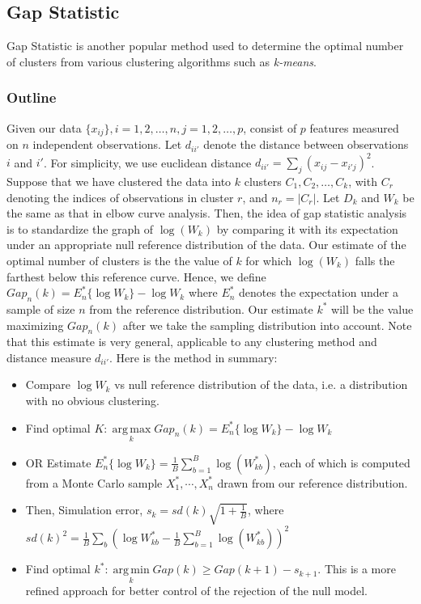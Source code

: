 \subsection{Gap Statistic} \label{2.2.3}
Gap Statistic \cite{Tibshirani2001} is another popular method used to determine the optimal number of clusters from various clustering algorithms such as \textit{k-means}. 
\subsubsection{Outline}
Given our data $\{x_{ij}\}, i =1,2,\dots,n, j = 1,2,\dots, p$, consist of $p$ features measured on $n$ independent observations. Let $d_{ii'}$ denote the distance between observations $i$ and $i'$. For simplicity, we use euclidean distance $d_{ii'} = \sum_j (x_{ij}-x_{i'j})^2$.
Suppose that we have clustered the data into $k$ clusters $C_1, C_2, \dots, C_k$, with $C_r$ denoting the indices of observations in cluster $r$, and $n_r = |C_r|$. Let $D_k$ and $W_k$ be the same as that in elbow curve analysis. Then, the idea of gap statistic analysis is to standardize the graph of $\log(W_k)$ by comparing it with its expectation under an appropriate null reference distribution of the data. Our estimate of the optimal number of clusters is the the value of $k$ for which $\log(W_k)$ falls the farthest below this reference curve. Hence, we define $Gap_n(k) = E_n^*\{\log W_k\}-\log W_k$ where $E_n^*$ denotes the expectation under a sample of size $n$ from the reference distribution. Our estimate $k^*$ will be the value maximizing $Gap_n(k)$ after we take the sampling distribution into account. Note that this estimate is very general, applicable to any clustering method and distance measure $d_{ii'}$. Here is the method in summary:
\begin{itemize}
	\item Compare $\log W_k$ vs null reference distribution of the data, i.e. a distribution with no obvious clustering.
	\item Find optimal $K: \operatorname*{arg\,max}\limits_k Gap_n(k) = E_n^*\{\log W_k\}-\log W_k$
	\item OR Estimate $E_n^*\{\log W_k\} = \frac{1}{B}\sum\limits_{b=1}^B \log (W_{kb}^*)$, each of which is computed from a Monte Carlo sample $X_1^*,\cdots, X_n^*$ drawn from our reference distribution.
	\item Then, Simulation error, $s_k = sd(k)\sqrt{1+\frac{1}{B}}$, where $sd(k)^2=\frac{1}{B}\sum\limits_b(\log W_{kb}^*-\frac{1}{B}\sum\limits_{b=1}^B \log(W_{kb}^*))^2$
	\item Find optimal $k^*: \operatorname*{arg\,min}\limits_k Gap(k)\geq Gap(k+1)-s_{k+1}$. This is a more refined approach for better control of the rejection of the null model.
\end{itemize}

